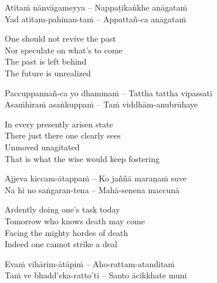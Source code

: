 \begin{verses}
  Atītaṁ nānvāgameyya – Nappaṭikaṅkhe anāgataṁ\\
  Yad atītam-pahīnan-taṁ – Appattañ-ca anāgataṁ
\end{verses}

\begin{english-verses}
  One should not revive the past\\
  Nor speculate on what's to come\\
  The past is left behind\\
  The future is unrealized
\end{english-verses}

\begin{verses}
  Paccuppannañ-ca yo dhammaṁ – Tattha tattha vipassati\\
  Asaṁhiraṁ asaṅkuppaṁ – Taṁ viddhām-anubrūhaye
\end{verses}

\begin{english-verses}
  In every presently arisen state\\
  There just there one clearly sees\\
  Unmoved unagitated\\
  That is what the wise would keep fostering\makeatletter\hyperlink{endnote43-appendix}\makeatother
\end{english-verses}

\begin{verses}
  Ajjeva kiccam-ātappaṁ – Ko jaññā maraṇaṁ suve\\
  Na hi no saṅgaran-tena – Mahā-senena maccunā
\end{verses}

\begin{english-verses}
  Ardently doing one's task today\\
  Tomorrow who knows death may come\\
  Facing the mighty hordes of death\\
  Indeed one cannot strike a deal
\end{english-verses}

\begin{verses}
  Evaṁ vihārim-ātāpiṁ – Aho-rattam-atanditaṁ\\
  Taṁ ve bhadd'eka-ratto'ti – Santo ācikkhate muni
\end{verses}

